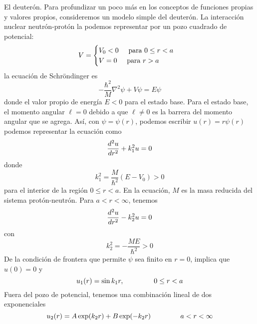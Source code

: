 \begin{ejemplo}{El deuterón.}
Para profundizar un poco más en los conceptos de funciones propias y valores propios, consideremos un modelo simple del deuterón. La interacción nuclear neutrón-protón la podemos representar por un pozo cuadrado de potencial:
\begin{equation}
V = \begin{cases}
V_{0} < 0 \hspace{0.5cm} \text{para } 0 \leq r < a \\
V = 0 \hspace{0.5cm} \text{para } r > a
\end{cases}
\end{equation}
la ecuación de Schröndinger es
\begin{equation}
- \dfrac{\hbar^{2}}{M} \nabla^{2} \psi + V \psi =  E \psi
\label{eq:ecuacion_10_10}
\end{equation}
donde el valor propio de energía $E < 0$ para el estado base. Para el estado base, el momento angular $ \ell = 0$ debido a que $\ell \neq 0$ es la barrera del momento angular que se agrega. Así, con $\psi =  \psi(r)$, podemos escribir $u(r) = r \psi (r)$ podemos representar la ecuación como
\begin{equation}
\dfrac{d^{2} u}{d r^{2}} + k_{1}^{2} u = 0
\label{eq:ecuacion_10_11}
\end{equation}
donde
\begin{equation}
k_{1}^{2} =  \dfrac{M}{\hbar^{2}} (E - V_{0}) > 0
\label{eq:ecuacion_10_12}
\end{equation}
para el interior de la región $0 \leq r < a$. En la ecuación, $M$ es la masa reducida del sistema protón-neutrón. Para $a < r < \infty$, tenemos
\begin{equation}
\dfrac{d^{2} u}{d r^{2}} - k_{2}^{2} u = 0
\label{eq:ecuacion_10_13}
\end{equation}
con
\begin{equation}
k_{2}^{2} = - \dfrac{ME}{\hbar^{2}} > 0
\label{eq:ecuacion_10_14}
\end{equation}
De la condición de frontera que permite $\psi$ sea finito en $r=0$, implica que $u(0)=0$ y
\begin{equation}
u_{1}(r) =  \sin k_{1} r, \hspace{1.5cm} 0 \leq r < a
\label{eq:ecuacion_10_15}
\end{equation}
Fuera del pozo de potencial, tenemos una combinación lineal de dos exponenciales
\begin{equation}
u_{2}(r) = A \exp(k_{2} r) + B \exp(-k_{2} r) \hspace{1.5cm} a < r < \infty

\end{equation}
\end{ejemplo}
